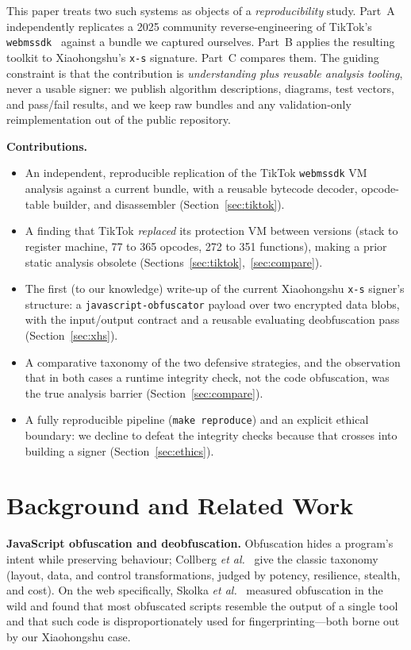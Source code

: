 \documentclass[conference,10pt]{IEEEtran}
\newcommand{\code}[1]{\texttt{\small #1}}
\begin{document}
This paper treats two such systems as objects of a \emph{reproducibility} study. Part~A independently replicates a 2025 community reverse-engineering of TikTok's \code{webmssdk}~\cite{tiktokref} against a bundle we captured ourselves. Part~B applies the resulting toolkit to Xiaohongshu's \code{x-s} signature. Part~C compares them. The guiding constraint is that the contribution is \emph{understanding plus reusable analysis tooling}, never a usable signer: we publish algorithm descriptions, diagrams, test vectors, and pass/fail results, and we keep raw bundles and any validation-only reimplementation out of the public repository.

\noindent\textbf{Contributions.}
\begin{itemize}
  \item An independent, reproducible replication of the TikTok \code{webmssdk} VM analysis against a current bundle, with a reusable bytecode decoder, opcode-table builder, and disassembler (Section~\ref{sec:tiktok}).
  \item A finding that TikTok \emph{replaced} its protection VM between versions (stack to register machine, 77 to 365 opcodes, 272 to 351 functions), making a prior static analysis obsolete (Sections~\ref{sec:tiktok},~\ref{sec:compare}).
  \item The first (to our knowledge) write-up of the current Xiaohongshu \code{x-s} signer's structure: a \code{javascript-obfuscator} payload over two encrypted data blobs, with the input/output contract and a reusable evaluating deobfuscation pass (Section~\ref{sec:xhs}).
  \item A comparative taxonomy of the two defensive strategies, and the observation that in both cases a runtime integrity check, not the code obfuscation, was the true analysis barrier (Section~\ref{sec:compare}).
  \item A fully reproducible pipeline (\code{make reproduce}) and an explicit ethical boundary: we decline to defeat the integrity checks because that crosses into building a signer (Section~\ref{sec:ethics}).
\end{itemize}

\section{Background and Related Work}
\label{sec:background}
\textbf{JavaScript obfuscation and deobfuscation.} Obfuscation hides a program's intent while preserving behaviour; Collberg \emph{et al.}~\cite{collberg1997taxonomy} give the classic taxonomy (layout, data, and control transformations, judged by potency, resilience, stealth, and cost). On the web specifically, Skolka \emph{et al.}~\cite{skolka2019anything} measured obfuscation in the wild and found that most obfuscated scripts resemble the output of a single tool and that such code is disproportionately used for fingerprinting---both borne out by our Xiaohongshu case.
\end{document}
